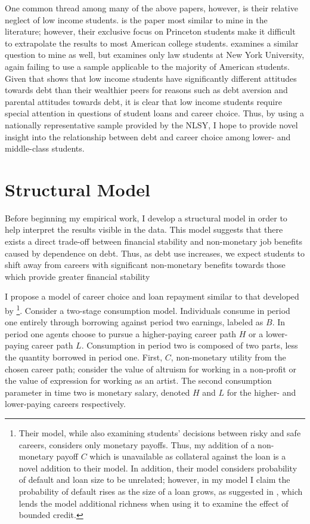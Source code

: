 \documentclass[12pt]{article}
\begin{document}
	One common thread among many of the above papers, however, is their relative neglect of low income students. \textcite{rothstein2011} is the paper most similar to mine in the literature; however, their exclusive focus on Princeton students make it difficult to extrapolate the results to most American college students. \textcite{field2009} examines a similar question to mine as well, but examines only law students at New York University, again failing to use a sample applicable to the majority of American students. Given that \textcite{callender2005} shows that low income students have significantly different attitudes towards debt than their wealthier peers for reasons such as debt aversion and parental attitudes towards debt, it is clear that low income students require special attention in questions of student loans and career choice. Thus, by using a nationally representative sample provided by the NLSY, I hope to provide novel insight into the relationship between debt and career choice among lower- and middle-class students.

	\section{Structural Model}
	
	Before beginning my empirical work, I develop a structural model in order to help interpret the results visible in the data. This model suggests that there exists a direct trade-off between financial stability and non-monetary job benefits caused by dependence on debt. Thus, as debt use increases, we expect students to shift away from careers with significant non-monetary benefits towards those which provide greater financial stability

	I propose a model of career choice and loan repayment similar to that developed by \textcite{abraham2018}
	\footnote{Their model, while also examining students' decisions between risky and safe careers, considers only monetary payoffs. Thus, my addition of a non-monetary payoff $C$ which is unavailable as collateral against the loan is a novel addition to their model. In addition, their model considers probability of default and loan size to be unrelated; however, in my model I claim the probability of default rises as the size of a loan grows, as suggested in \textcite{dynarski2015}, which lends the model additional richness when using it to examine the effect of bounded credit.}. 
	Consider a two-stage consumption model. Individuals consume in period one entirely through borrowing against period two earnings, labeled as $B$. In period one agents choose to pursue a higher-paying career path $H$ or a lower-paying career path $L$. Consumption in period two is composed of two parts, less the quantity borrowed in period one. First, $C$, non-monetary utility from the chosen career path; consider the value of altruism for working in a non-profit or the value of expression for working as an artist. The second consumption parameter in time two is monetary salary, denoted $H$ and $L$ for the higher- and lower-paying careers respectively.
	
\end{document}
